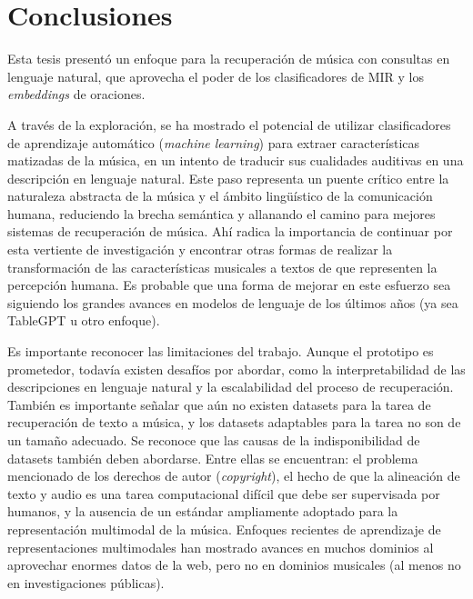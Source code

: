 \chapter*{Conclusiones}
\label{chap:conclusions}
Esta tesis presentó un enfoque para la recuperación de música con consultas en lenguaje natural, que aprovecha el poder de los clasificadores de MIR y los \textit{embeddings} de oraciones.

A través de la exploración, se ha mostrado el potencial de utilizar clasificadores de aprendizaje automático (\textit{machine learning}) para extraer características matizadas de la música, en un intento de traducir sus cualidades auditivas en una descripción en lenguaje natural. Este paso representa un puente crítico entre la naturaleza abstracta de la música y el ámbito lingüístico de la comunicación humana, reduciendo la brecha semántica y allanando el camino para mejores sistemas de recuperación de música. Ahí radica la importancia de continuar por esta vertiente de investigación y encontrar otras formas de realizar la transformación de las características musicales a textos de que representen la percepción humana. Es probable que una forma de mejorar en este esfuerzo sea siguiendo los grandes avances en modelos de lenguaje de los últimos años (ya sea TableGPT u otro enfoque).


Es importante reconocer las limitaciones del trabajo. Aunque el prototipo es prometedor, todavía existen desafíos por abordar, como la interpretabilidad de las descripciones en lenguaje natural y la escalabilidad del proceso de recuperación. También es importante señalar que aún no existen datasets para la tarea de recuperación de texto a música, y los datasets adaptables para la tarea no son de un tamaño adecuado. 
Se reconoce que las causas de la indisponibilidad de datasets también deben abordarse. Entre ellas se encuentran: el problema mencionado de los derechos de autor (\textit{copyright}), el hecho de que la alineación de texto y audio es una tarea computacional difícil que debe ser supervisada por humanos, y la ausencia de un estándar ampliamente adoptado para la representación multimodal de la música. Enfoques recientes de aprendizaje de representaciones multimodales han mostrado avances en muchos dominios al aprovechar enormes datos de la web, pero no en dominios musicales (al menos no en investigaciones públicas).

